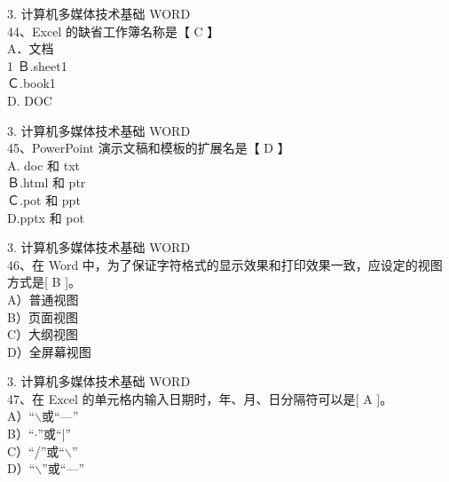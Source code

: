\documentclass[aspectratio=169]{beamer}
\begin{document}
\begin{frame}[t]{3. 计算机多媒体技术基础} \vspace{20pt}
    WORD\\
44、Excel 的缺省工作簿名称是【 C 】\\
A．文档\\ 1 Ｂ.sheet1\\
Ｃ.book1\\ D. DOC\\
\end{frame}




\begin{frame}[t]{3. 计算机多媒体技术基础} \vspace{20pt}
    WORD\\
45、PowerPoint 演示文稿和模板的扩展名是【 D 】\\
A. doc 和 txt\\ Ｂ.html 和 ptr\\
Ｃ.pot 和 ppt\\ D.pptx 和 pot\\
\end{frame}




\begin{frame}[t]{3. 计算机多媒体技术基础} \vspace{20pt}
    WORD\\
46、在 Word 中，为了保证字符格式的显示效果和打印效果一致，应设定的视图方式是[ B ]。\\
A）普通视图\\ B）页面视图\\ C）大纲视图\\ D）全屏幕视图\\
\end{frame}



\begin{frame}[t]{3. 计算机多媒体技术基础} \vspace{20pt}
    WORD\\

47、在 Excel 的单元格内输入日期时，年、月、日分隔符可以是[ A ]。\\
A）“$\backslash$或“$—$”\\ B）“$\cdot$”或“|”\\
C）“/”或“$\backslash$”\\ D）“$\backslash$”或“—”\\
\end{frame}
\end{document}
